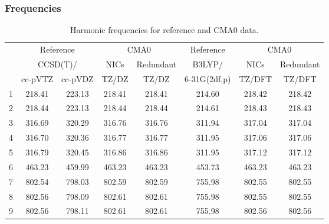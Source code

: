 \documentclass[10pt,oneside]{article}
\begin{document}
\begin{table}[h!]
\subsubsection*{Frequencies}
\centering
\caption{Harmonic frequencies for reference and CMA0 data.}
\begin{tabular}{cccccccc}
\toprule
{} & \multicolumn{2}{c}{Reference} & \multicolumn{2}{c}{CMA0} &    Reference & \multicolumn{2}{c}{CMA0} \\
{} & \multicolumn{2}{c}{CCSD(T)/} &   NICs &  Redundant &       B3LYP/ &   NICs & Redundant \\
{} &   cc-pVTZ & cc-pVDZ &  TZ/DZ &      TZ/DZ & 6-31G(2df,p) & TZ/DFT &    TZ/DFT \\
\midrule
1 &    218.41 &  223.13 & 218.41 &     218.41 &       214.60 & 218.42 &    218.42 \\
2 &    218.44 &  223.13 & 218.44 &     218.44 &       214.61 & 218.43 &    218.43 \\
3 &    316.69 &  320.29 & 316.76 &     316.76 &       311.94 & 317.04 &    317.04 \\
4 &    316.70 &  320.36 & 316.77 &     316.77 &       311.95 & 317.06 &    317.06 \\
5 &    316.79 &  320.45 & 316.86 &     316.86 &       311.95 & 317.12 &    317.12 \\
6 &    463.23 &  459.99 & 463.23 &     463.23 &       453.73 & 463.23 &    463.23 \\
7 &    802.54 &  798.03 & 802.59 &     802.59 &       755.98 & 802.55 &    802.55 \\
8 &    802.56 &  798.09 & 802.61 &     802.61 &       755.98 & 802.55 &    802.55 \\
9 &    802.56 &  798.11 & 802.61 &     802.61 &       755.98 & 802.56 &    802.56 \\
\bottomrule
\end{tabular}
\end{table}
\end{document}
